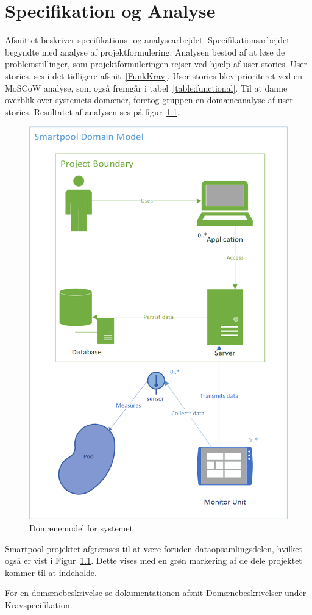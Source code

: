 \chapter{Specifikation og Analyse}\label{SpecOgAnalyse}
Afsnittet beskriver specifikations- og analysearbejdet. Specifikationsarbejdet begyndte med analyse af projektformulering. Analysen bestod af at løse de problemstillinger, som projektformuleringen rejser ved hjælp af user stories. User stories, ses i det tidligere afsnit~\ref{FunkKrav}. User stories blev prioriteret ved en MoSCoW analyse, som også fremgår i tabel~\ref{table:functional}. Til at danne overblik over systemets domæner, foretog gruppen en domæneanalyse af user stories. Resultatet af analysen ses på figur~\ref{fig:domainmodelboundary}.

\begin{figure}
	\centering
	\includegraphics[width=0.6\linewidth]{figs/ProjectBoundary}
	\caption{Domænemodel for systemet}
	\label{fig:domainmodelboundary}
\end{figure}

Smartpool projektet afgrænses til at være foruden dataopsamlingsdelen, hvilket også er vist i Figur~\ref{fig:domainmodelboundary}. Dette vises med en grøn markering af de dele projektet kommer til at indeholde.

For en domænebeskrivelse se dokumentationen afsnit Domænebeskrivelser under Kravspecifikation.

